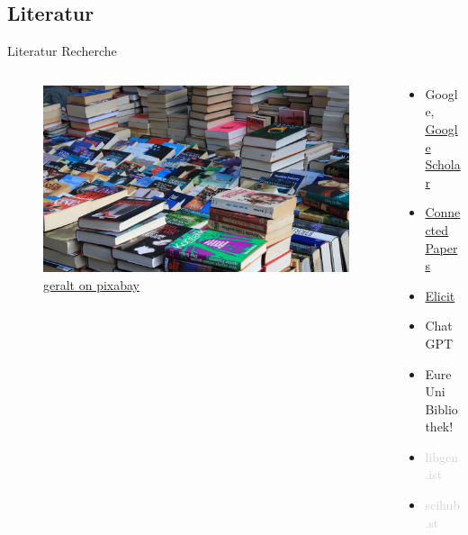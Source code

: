 \documentclass[aspectratio=169,shownotes]{beamer}
\begin{document}
\subsection{Literatur}
\begin{frame}{Literatur Recherche}
    \begin{columns}[t]
        \begin{column}{0.39\textwidth}      
            \vspace{-2em} 
            \begin{figure}[t]
                \begin{flushleft}
                    \includegraphics[height=0.8\textheight,trim={11cm 0 15cm 0},clip]{graphics/Flohmarkt.jpg}         
                    \caption*{\href{https://pixabay.com/de/photos/flohmarkt-bücher-kiste-stöbern-237460/}{geralt on pixabay}}    
                \end{flushleft}
            \end{figure}
        \end{column}        
        \begin{column}{0.69\textwidth}
            \begin{itemize}
                \item Google, \href{https://scholar.google.com/}{Google Scholar}
                \item \href{https://www.connectedpapers.com/}{Connected Papers}
                \item \href{https://elicit.com/}{Elicit}
                \item ChatGPT
                \item Eure Uni Bibliothek!
            \end{itemize}           
            \vspace{1cm}            
            \begin{itemize}
                \item \textcolor{lightgray}{libgen.ist}
                \item \textcolor{lightgray}{scihub.st}
            \end{itemize} 
        \end{column}        
    \end{columns}  
\end{frame}
\end{document}
